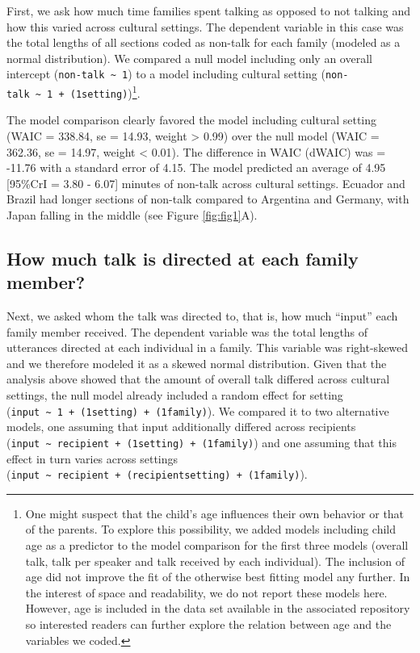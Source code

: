 \documentclass[
  man,floatsintext]{apa6}
\begin{document}
First, we ask how much time families spent talking as opposed to not talking and how this varied across cultural settings. The dependent variable in this case was the total lengths of all sections coded as non-talk for each family (modeled as a normal distribution). We compared a null model including only an overall intercept (\texttt{non-talk\ \textasciitilde{}\ 1}) to a model including cultural setting (\texttt{non-talk\ \textasciitilde{}\ 1\ +\ (1\textbar{}setting)})\footnote{One might suspect that the child's age influences their own behavior or that of the parents. To explore this possibility, we added models including child age as a predictor to the model comparison for the first three models (overall talk, talk per speaker and talk received by each individual). The inclusion of age did not improve the fit of the otherwise best fitting model any further. In the interest of space and readability, we do not report these models here. However, age is included in the data set available in the associated repository so interested readers can further explore the relation between age and the variables we coded.}.

The model comparison clearly favored the model including cultural setting (WAIC = 338.84, se = 14.93, weight \textgreater{} 0.99) over the null model (WAIC = 362.36, se = 14.97, weight \textless{} 0.01). The difference in WAIC (dWAIC) was = -11.76 with a standard error of 4.15. The model predicted an average of 4.95 {[}95\%CrI = 3.80 - 6.07{]} minutes of non-talk across cultural settings. Ecuador and Brazil had longer sections of non-talk compared to Argentina and Germany, with Japan falling in the middle (see Figure \ref{fig:fig1}A).

\hypertarget{how-much-talk-is-directed-at-each-family-member}{%
\subsection{How much talk is directed at each family member?}\label{how-much-talk-is-directed-at-each-family-member}}

Next, we asked whom the talk was directed to, that is, how much ``input'' each family member received. The dependent variable was the total lengths of utterances directed at each individual in a family. This variable was right-skewed and we therefore modeled it as a skewed normal distribution. Given that the analysis above showed that the amount of overall talk differed across cultural settings, the null model already included a random effect for setting (\texttt{input\ \textasciitilde{}\ 1\ +\ (1\textbar{}setting)\ +\ (1\textbar{}family)}). We compared it to two alternative models, one assuming that input additionally differed across recipients (\texttt{input\ \textasciitilde{}\ recipient\ +\ (1\textbar{}setting)\ +\ (1\textbar{}family)}) and one assuming that this effect in turn varies across settings (\texttt{input\ \textasciitilde{}\ recipient\ +\ (recipient\textbar{}setting)\ +\ (1\textbar{}family)}).
\end{document}

